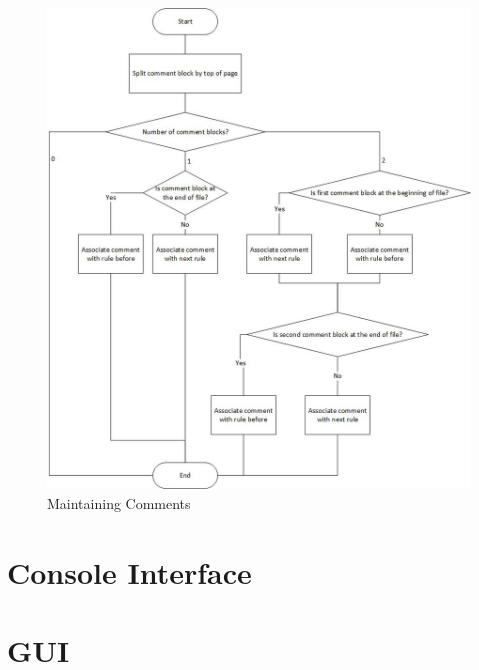 \begin{figure}[H]
\centering
\includegraphics[width=1\textwidth]{images/maintainingComments.jpg}
\caption{Maintaining Comments}
\label{fig:comments}

\end{figure}

\section{Console Interface}\label{sec:Console Interface}

\section{GUI}\label{sec:ConceptGUI}


